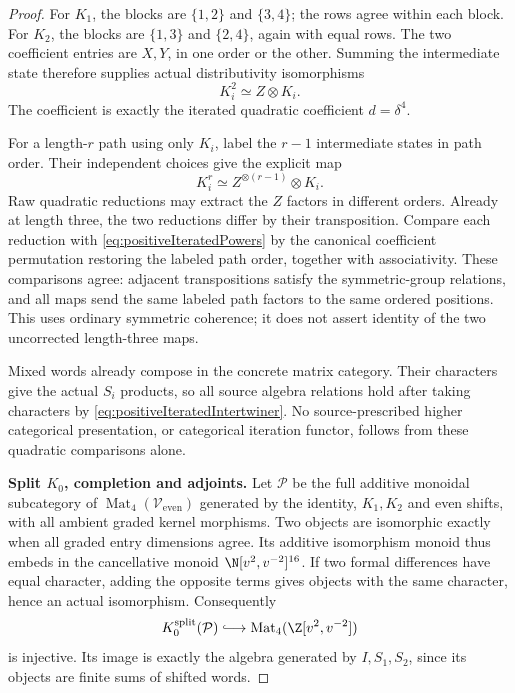 \begin{proof}
For \(K_1\), the blocks are \(\{1,2\}\) and
\(\{3,4\}\); the rows agree within each block.
For \(K_2\), the blocks are \(\{1,3\}\) and
\(\{2,4\}\), again with equal rows.
The two coefficient entries are \(X,Y\), in one
order or the other. Summing the intermediate state
therefore supplies actual distributivity isomorphisms
\begin{equation}\label{eq:positiveIteratedQuadratic}
                             K_i^2\simeq Z\otimes K_i.
\end{equation}
The coefficient is exactly the iterated quadratic
coefficient \(d=\delta^4\).

For a length-\(r\) path using only \(K_i\), label
the \(r-1\) intermediate states in path order.
Their independent choices give the explicit map
\begin{equation}\label{eq:positiveIteratedPowers}
                       K_i^r\simeq
                          Z^{\otimes(r-1)}\otimes K_i.
\end{equation}
Raw quadratic reductions may extract the \(Z\)
factors in different orders. Already at length three,
the two reductions differ by their transposition.
Compare each reduction with
\eqref{eq:positiveIteratedPowers} by the canonical
coefficient permutation restoring the labeled path
order, together with associativity.
These comparisons agree: adjacent transpositions
satisfy the symmetric-group relations, and all maps
send the same labeled path factors to the same
ordered positions. This uses ordinary symmetric
coherence; it does not assert identity of the two
uncorrected length-three maps.

Mixed words already compose in the concrete matrix
category. Their characters give the actual \(S_i\)
products, so all source algebra relations hold after
taking characters by
\eqref{eq:positiveIteratedIntertwiner}.
No source-prescribed higher categorical presentation,
or categorical iteration functor, follows from these
quadratic comparisons alone.

\par\smallskip\noindent\textbf{Split \(K_0\), completion and adjoints.}\quad
Let \(\mathcal P\) be the full additive monoidal
subcategory of \(\operatorname{Mat}_4(\mathcal
V_{\mathrm{even}})\) generated by the identity,
\(K_1,K_2\) and even shifts, with all ambient graded
kernel morphisms.
Two objects are isomorphic exactly when all graded
entry dimensions agree. Its additive isomorphism
monoid thus embeds in the cancellative monoid
\(\N[v^2,v^{-2}]^{16}\).
If two formal differences have equal character,
adding the opposite terms gives objects with the
same character, hence an actual isomorphism.
Consequently
\[
 K_0^{\mathrm{split}}(\mathcal P)
       \lhook\joinrel\longrightarrow
            \operatorname{Mat}_4(\Z[v^2,v^{-2}])
\]
is injective. Its image is exactly the algebra
generated by \(I,S_1,S_2\), since its objects are
finite sums of shifted words.


\end{proof}

